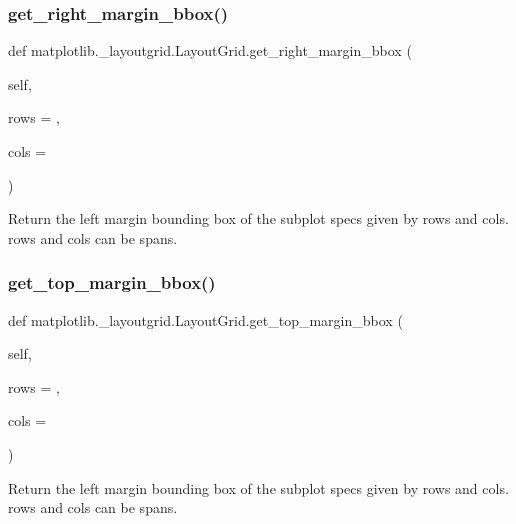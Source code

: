 \subsubsection{\texorpdfstring{get\+\_\+right\+\_\+margin\+\_\+bbox()}{get\_right\_margin\_bbox()}}
{\footnotesize\ttfamily def matplotlib.\+\_\+layoutgrid.\+Layout\+Grid.\+get\+\_\+right\+\_\+margin\+\_\+bbox (\begin{DoxyParamCaption}\item[{}]{self,  }\item[{}]{rows = {},  }\item[{}]{cols = {} }\end{DoxyParamCaption})}

\begin{DoxyVerb}Return the left margin bounding box of the subplot specs
given by rows and cols.  rows and cols can be spans.
\end{DoxyVerb}
 \mbox{\label{classmatplotlib_1_1__layoutgrid_1_1LayoutGrid_a21e8c7edd4b4b93cde516a2751a47719}} 
\subsubsection{\texorpdfstring{get\+\_\+top\+\_\+margin\+\_\+bbox()}{get\_top\_margin\_bbox()}}
{\footnotesize\ttfamily def matplotlib.\+\_\+layoutgrid.\+Layout\+Grid.\+get\+\_\+top\+\_\+margin\+\_\+bbox (\begin{DoxyParamCaption}\item[{}]{self,  }\item[{}]{rows = {},  }\item[{}]{cols = {} }\end{DoxyParamCaption})}

\begin{DoxyVerb}Return the left margin bounding box of the subplot specs
given by rows and cols.  rows and cols can be spans.
\end{DoxyVerb}
 \mbox{\label{classmatplotlib_1_1__layoutgrid_1_1LayoutGrid_a2392f92b649857e0143e028d84bc7b97}} 
